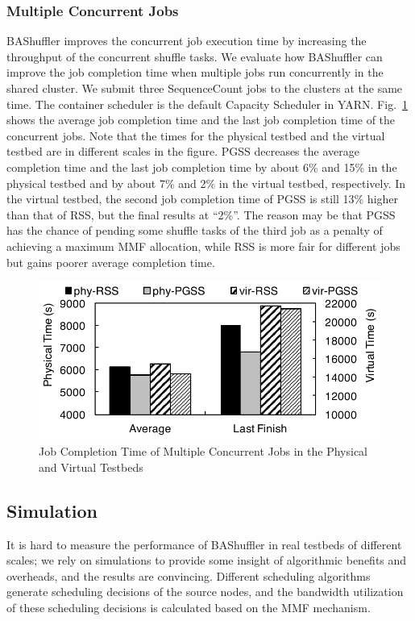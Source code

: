 \documentclass[10pt,journal,compsoc]{IEEEtran}
\begin{document}
\subsubsection{Multiple Concurrent Jobs}
BAShuffler improves the concurrent job execution time by increasing
the throughput of the concurrent shuffle tasks.
We evaluate how BAShuffler can improve the job completion time when
multiple jobs run concurrently in the shared cluster.
We submit three SequenceCount jobs to the clusters at the same time.
The container scheduler is the default Capacity Scheduler in YARN. 
Fig.~\ref{fig:r_concurrent} shows the average job completion time and
the last job completion time of the concurrent jobs.
Note that the times for the physical testbed and the virtual testbed
are in different scales in the figure.
PGSS decreases the average completion time and the last job
completion time by about 6\% and 15\% in the physical testbed 
and by about 7\% and 2\% in the virtual testbed, respectively. 
In the virtual testbed, the second job completion time of PGSS is still 13\% higher than that of RSS, but the final results at ``2\%''.
The reason may be that PGSS has the chance of pending some shuffle tasks of the third job as a penalty of achieving a maximum MMF allocation, 
while RSS is more fair for different jobs but gains poorer average completion time. 


\begin{figure}[!t]
\centering
\includegraphics[width=0.9\columnwidth,height=0.4\columnwidth]{figure12}
\caption{Job Completion Time of Multiple Concurrent Jobs in the Physical and Virtual Testbeds}
\label{fig:r_concurrent}
\end{figure}


\subsection{Simulation}
It is hard to measure the performance of BAShuffler in real
testbeds of different scales; we rely on
simulations to provide some insight of algorithmic benefits and
overheads, and the results are convincing.  %
Different scheduling algorithms generate scheduling decisions
of the source nodes,
and the bandwidth utilization of these scheduling
decisions is calculated based on the MMF mechanism.
\end{document}

